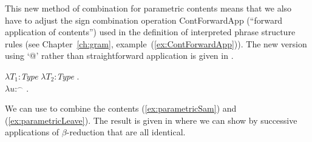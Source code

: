 This new method of combination for parametric contents means that we
also have to adjust the sign combination operation ContForwardApp
(``forward application of contents'') used in the definition of
interpreted phrase structure rules (see Chapter~\ref{ch:gram},
example~(\ref{ex:ContForwardApp})).  The new version using `@' rather
than straightforward application is given in \nexteg{}.
\begin{ex} 
$\lambda T_1$:\textit{Type} $\lambda T_2$:\textit{Type} . \\
\hspace*{1em}$\lambda
u$:$^{\frown}$
    . \\
\hspace*{2em}
\label{ex:ContForwardApp@}                                                                          
\end{ex} 
  

We can use \preveg{} to combine the contents (\ref{ex:parametricSam}) and
(\ref{ex:parametricLeave}).  The result is given in \nexteg{} where we can
show by successive applications of $\beta$-reduction that
 are all identical.



